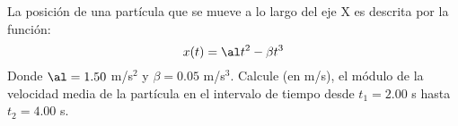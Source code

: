 La posici\'on de una part\'icula que se mueve a lo largo del eje X es descrita por la funci\'on: 
$$x(t) = \al t^{2} - \beta t^{3} $$ 
Donde $\al = 1.50$ m/s$^{2}$ y $\beta = 0.05$ m/s$^{3}$. Calcule (en m/s), el módulo de la velocidad media de la part\'icula en el intervalo de tiempo desde $t_{1}=2.00$ s hasta $t_{2}=4.00$ s.
